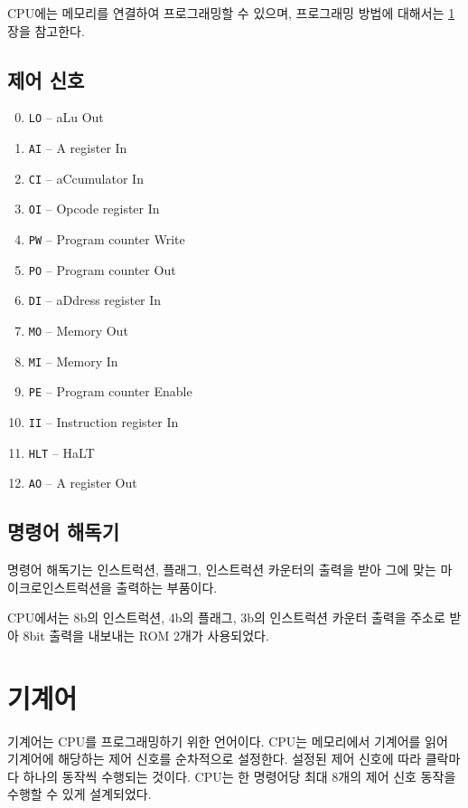 \documentclass{article}
\begin{document}
CPU에는 메모리를 연결하여 프로그래밍할 수 있으며,
프로그래밍 방법에 대해서는 \ref{sec:machlang}장을 참고한다.

\subsection{제어 신호}

\begin{enumerate}
    \setcounter{enumi}{-1}
    \item \texttt{LO} -- aLu Out
    \item \texttt{AI} -- A register In
    \item \texttt{CI} -- aCcumulator In
    \item \texttt{OI} -- Opcode register In
    \item \texttt{PW} -- Program counter Write
    \item \texttt{PO} -- Program counter Out
    \item \texttt{DI} -- aDdress register In
    \item \texttt{MO} -- Memory Out
    \item \texttt{MI} -- Memory In
    \item \texttt{PE} -- Program counter Enable
    \item \texttt{II} -- Instruction register In
    \item \texttt{HLT} -- HaLT
    \item \texttt{AO} -- A register Out
\end{enumerate}

\subsection{명령어 해독기}

명령어 해독기는 인스트럭션, 플래그, 인스트럭션 카운터의 출력을 받아
그에 맞는 마이크로인스트럭션을 출력하는 부품이다.

CPU에서는 8b의 인스트럭션, 4b의 플래그, 3b의 인스트럭션 카운터 출력을 주소로 받아
8bit 출력을 내보내는 ROM 2개가 사용되었다.

\section{기계어}
\label{sec:machlang}

기계어는 CPU를 프로그래밍하기 위한 언어이다.
CPU는 메모리에서 기계어를 읽어 기계어에 해당하는
제어 신호를 순차적으로 설정한다.
설정된 제어 신호에 따라 클락마다 하나의 동작씩 수행되는 것이다.
CPU는 한 명령어당 최대 8개의 제어 신호 동작을 수행할 수 있게
설계되었다.
\end{document}
